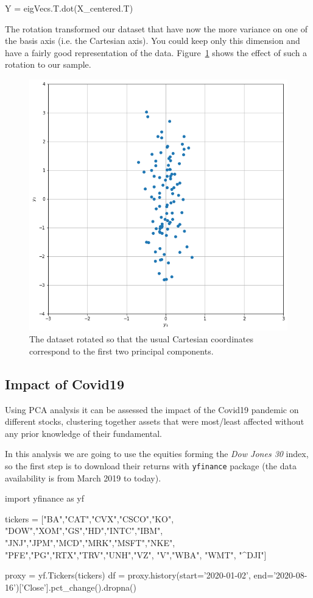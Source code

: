 \begin{ipython}
Y = eigVecs.T.dot(X_centered.T)
\end{ipython}

The rotation transformed our dataset that have now the more variance on one of the basis axis (i.e. the Cartesian axis). 
You could keep only this dimension and have a fairly good representation of the data. Figure~\ref{fig:pca_rotated} shows the effect of such a rotation to our sample.
\clearpage
\begin{figure}[htb]
	\centering
	\includegraphics[width=0.5\linewidth]{figures/pca_rotated}
	\caption{The dataset rotated so that the usual Cartesian coordinates
		correspond to the first two principal components.}
	\label{fig:pca_rotated}
\end{figure}

\subsection{Impact of Covid19}
Using PCA analysis it can be assessed the impact of the Covid19 pandemic on different stocks, clustering together assets that were most/least affected without any prior knowledge of their fundamental.

In this analysis we are going to use the equities forming the \emph{Dow Jones 30} index, so the first step is to download their returns with \texttt{yfinance} package (the data availability is from March 2019 to today).

\begin{ipython}
import yfinance as yf

tickers = ["BA","CAT","CVX","CSCO","KO",
	       "DOW","XOM","GS","HD","INTC","IBM",
	       "JNJ","JPM","MCD","MRK","MSFT","NKE",
	       "PFE","PG","RTX","TRV","UNH","VZ",
	       "V","WBA", "WMT", "^DJI"]
	
proxy = yf.Tickers(tickers)           
df = proxy.history(start='2020-01-02',
                   end='2020-08-16')['Close'].pct_change().dropna()
\end{ipython}

